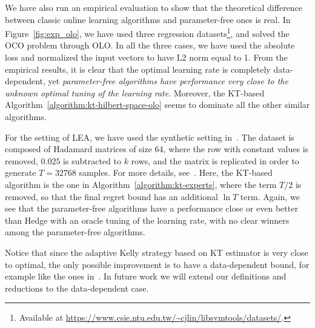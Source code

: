 We have also run an empirical evaluation to show that the theoretical difference
between classic online learning algorithms and parameter-free ones is real. In
Figure~\ref{fig:exp_olo}, we have used three regression
datasets\footnote{Available at
\url{https://www.csie.ntu.edu.tw/~cjlin/libsvmtools/datasets/}.}, and solved the
\ac{OCO} problem through \ac{OLO}. In all the three cases, we have used the
absolute loss and normalized the input vectors to have L2 norm equal to 1. From
the empirical results, it is clear that the optimal learning rate is completely
data-dependent, yet \emph{parameter-free algorithms have performance very close
to the unknown optimal tuning of the learning rate}. Moreover, the KT-based
Algorithm~\ref{algorithm:kt-hilbert-space-olo} seems to dominate all the other
similar algorithms.

For the setting of \ac{LEA}, we have used the synthetic setting
in~\cite{Chaudhuri-Freund-Hsu-2009}. The dataset is composed of Hadamard
matrices of size 64, where the row with constant values is removed, $0.025$ is
subtracted to $k$ rows, and the matrix is replicated in order to generate
$T=32768$ samples. For more details, see~\cite{Chaudhuri-Freund-Hsu-2009}. Here,
the KT-based algorithm is the one in Algorithm~\ref{algorithm:kt-experts}, where
the term $T/2$ is removed, so that the final regret bound has an additional $\ln
T$ term.  Again, we see that the parameter-free algorithms have a performance
close or even better than Hedge with an oracle tuning of the learning rate, with
no clear winners among the parameter-free algorithms.

Notice that since the adaptive Kelly strategy based on
KT estimator is very close to optimal, the only possible improvement is to
have a data-dependent bound, for example like the ones
in~\cite{Koolen-van-Erven-2015}.  In future work we will extend our definitions
and reductions to the data-dependent case.



